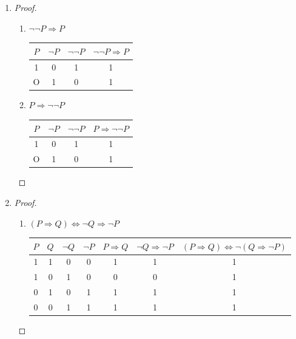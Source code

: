 \documentclass{article}
\begin{document}
\begin{enumerate}
		\item \begin{proof}
			\begin{enumerate}
				\item[a)] $\neg \neg P \Rightarrow P$
				
				\begin{center}
					\begin{tabular}{|c|c|c|c|}
						\hline
						$P$ & $\neg P$ & $\neg \neg P$ & $\neg \neg P \Rightarrow P$ \\
						\hline
						1 & 0 & 1 & 1 \\
						O & 1 & 0 & 1 \\
						\hline
					\end{tabular}
					\end{center}
				\item[b)] $P \Rightarrow \neg \neg P$ 
				
				\begin{center}
					\begin{tabular}{|c|c|c|c|}
						\hline
						$P$ & $\neg P$ & $\neg \neg P$ & $ P \Rightarrow \neg \neg P$ \\
						\hline
						1 & 0 & 1 & 1 \\
						O & 1 & 0 & 1 \\
						\hline
					\end{tabular}
				\end{center}
				
			\end{enumerate}
		\end{proof}
		
		\item \begin{proof} 
			
			\begin{enumerate}
			\item[a)] $(P \Rightarrow Q) \iff \neg Q \Rightarrow \neg P$
			
			\begin{center}
				\begin{tabular}{|c|c|c|c|c|c|c|}
					\hline
					$P$ & $Q$ & $\neg Q$ & $\neg P$ & $P \Rightarrow Q$ & $\neg Q \Rightarrow \neg P$ & $ (P \Rightarrow Q) \iff \neg (Q \Rightarrow \neg P)$ \\
					\hline
					1 & 1 & 0 & 0 & 1 & 1 & 1  \\
					1 & 0 & 1 & 0 & 0 & 0 & 1  \\
					0 & 1 & 0 & 1 & 1 & 1 & 1  \\
					0 & 0 & 1 & 1 & 1 & 1 & 1  \\
					\hline
				\end{tabular}
			\end{center}
			

\end{enumerate}
\end{proof}
\end{enumerate}
\end{document}
